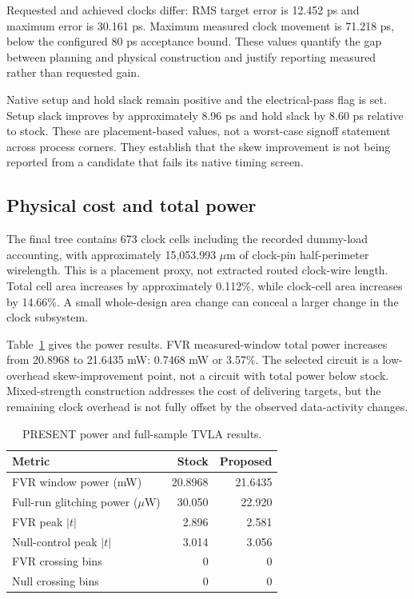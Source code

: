 \documentclass[conference]{IEEEtran}
\begin{document}
Requested and achieved clocks differ: RMS target error is 12.452 ps and maximum error is 30.161 ps. Maximum measured clock movement is 71.218 ps, below the configured 80 ps acceptance bound. These values quantify the gap between planning and physical construction and justify reporting measured rather than requested gain.

Native setup and hold slack remain positive and the electrical-pass flag is set. Setup slack improves by approximately 8.96 ps and hold slack by 8.60 ps relative to stock. These are placement-based values, not a worst-case signoff statement across process corners. They establish that the skew improvement is not being reported from a candidate that fails its native timing screen.

\subsection{Physical cost and total power}
The final tree contains 673 clock cells including the recorded dummy-load accounting, with approximately 15,053.993 $\mu$m of clock-pin half-perimeter wirelength. This is a placement proxy, not extracted routed clock-wire length. Total cell area increases by approximately 0.112\%, while clock-cell area increases by 14.66\%. A small whole-design area change can conceal a larger change in the clock subsystem.

Table~\ref{tab:power} gives the power results. FVR measured-window total power increases from 20.8968 to 21.6435 mW: 0.7468 mW or 3.57\%. The selected circuit is a low-overhead skew-improvement point, not a circuit with total power below stock. Mixed-strength construction addresses the cost of delivering targets, but the remaining clock overhead is not fully offset by the observed data-activity changes.
\begin{table}[!t]
\caption{PRESENT power and full-sample TVLA results.}\label{tab:power}
\centering\begin{tabular}{lrr}\hline
Metric & Stock & Proposed\\\hline
FVR window power (mW) & 20.8968 & 21.6435\\
Full-run glitching power ($\mu$W) & 30.050 & 22.920\\
FVR peak $|t|$ & 2.896 & 2.581\\
Null-control peak $|t|$ & 3.014 & 3.056\\
FVR crossing bins & 0 & 0\\
Null crossing bins & 0 & 0\\\hline
\end{tabular}
\end{table}
\end{document}
